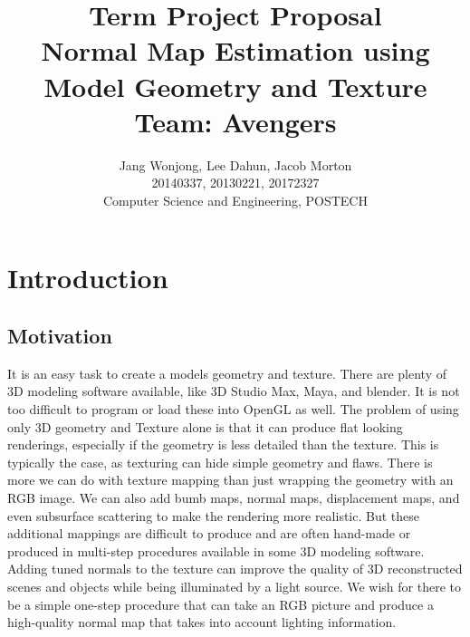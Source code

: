 \documentclass[10pt,twocolumn,letterpaper]{article}
\begin{document}
	
\title{Term Project Proposal \\
Normal Map Estimation using Model Geometry and Texture \\
Team: Avengers }
\author{Jang Wonjong, Lee Dahun, Jacob Morton\\
	20140337, 20130221, 20172327\\
	Computer Science and Engineering, POSTECH\\
	{\tt\small}}

\maketitle

\section{Introduction}
\subsection{Motivation}
It is an easy task to create a models geometry and texture. There are plenty of 3D modeling software available, like 3D Studio Max, Maya, and blender. It is not too difficult to program or load these into OpenGL as well. The problem of using only 3D geometry and Texture alone is that it can produce flat looking renderings, especially if the geometry is less detailed than the texture. This is typically the case, as texturing can hide simple geometry and flaws. There is more we can do with texture mapping than just wrapping the geometry with an RGB image. We can also add bumb maps, normal maps, displacement maps, and even subsurface scattering to make the rendering more realistic. But these additional mappings are difficult to produce and are often hand-made or produced in multi-step procedures available in some 3D modeling software. Adding tuned normals to the texture can improve the quality of 3D reconstructed scenes and objects while being illuminated by a light source. We wish for there to be a simple one-step procedure that can take an RGB picture and produce a high-quality normal map that takes into account lighting information.
\end{document}
